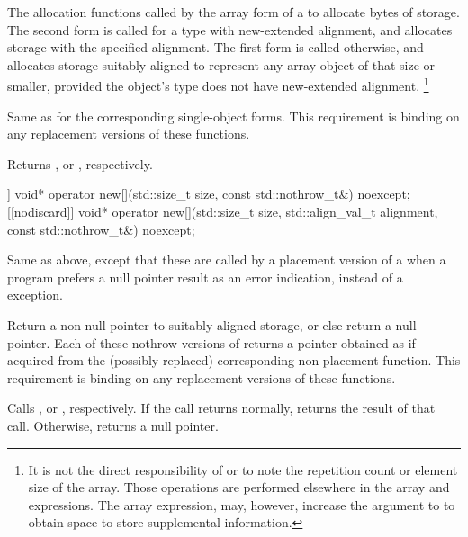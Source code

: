 \begin{itemdescr}
\pnum
\effects
The
allocation functions
called by the array form of a
to allocate
 bytes of storage.
The second form is called for a type with new-extended alignment,
and allocates storage
with the specified alignment.
The first form is called otherwise,
and allocates storage
suitably aligned to represent any array object of that size or smaller,
provided the object's type does not have new-extended alignment.%
\footnote{It is not the direct responsibility of
or
to note the repetition count or element size of the array.
Those operations are performed elsewhere in the array
and
expressions.
The array
expression, may, however, increase the  argument to
to obtain space to store supplemental information.}

\pnum
\replaceable
{}

\pnum
\required
Same as for
the corresponding single-object forms.
This requirement is binding on any replacement versions of these functions.

\pnum
{}
Returns
,
or
,
respectively.
\end{itemdescr}

%
\begin{itemdecl}
[[nodiscard]] void* operator new[](std::size_t size, const std::nothrow_t&) noexcept;
[[nodiscard]] void* operator new[](std::size_t size, std::align_val_t alignment,
                                   const std::nothrow_t&) noexcept;
\end{itemdecl}

\begin{itemdescr}
\pnum
\effects
Same as above, except that these are called by a placement version of a
when a \Cpp{} program prefers a null pointer result as an error indication,
instead of a
exception.

\pnum
\replaceable
{}

\pnum
\required
Return a non-null pointer to suitably aligned storage,
or else return a null pointer.
Each of these nothrow versions of
returns a pointer obtained as if
acquired from the (possibly replaced)
corresponding non-placement function.
This requirement is binding on any replacement versions of these functions.

\pnum
{}
Calls ,
or ,
respectively.
If the call returns normally,
returns the result of that call.
Otherwise, returns a null pointer.
\end{itemdescr}


